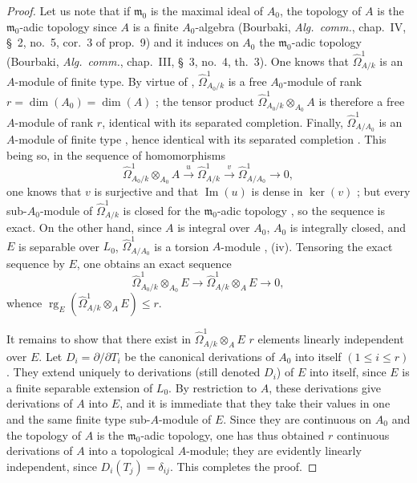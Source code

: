 \begin{proof}
Let us note that if $\mathfrak{m}_0$ is the maximal ideal of $A_0$, the topology of $A$ is the $\mathfrak{m}_0$-adic topology since $A$ is a finite $A_0$-algebra (Bourbaki, \emph{Alg.\ comm.}, chap.~IV, \S~2, no.~5, cor.~3 of prop.~9) and it induces on $A_0$ the $\mathfrak{m}_0$-adic topology (Bourbaki, \emph{Alg.\ comm.}, chap.~III, \S~3, no.~4, th.~3).
One knows  that $\widehat{\Omega}^1_{A/k}$ is an $A$-module of finite type.
By virtue of , $\widehat{\Omega}^1_{A_0/k}$ is a free $A_0$-module of rank $r=\dim(A_0)=\dim(A)$ ; the tensor product $\widehat{\Omega}^1_{A_0/k}\otimes_{A_0}A$ is therefore a free $A$-module of rank $r$, identical with its separated completion.
Finally, $\widehat{\Omega}^1_{A/A_0}$ is an $A$-module of finite type , hence identical with its separated completion .
This being so, in the sequence of homomorphisms
\begin{equation}
\tag{21.9.5.2}
  \label{0.21.9.5.2}
  \widehat{\Omega}^1_{A_0/k}\otimes_{A_0} A\xrightarrow{u}\widehat{\Omega}^1_{A/k}\xrightarrow{v}\widehat{\Omega}^1_{A/A_0}\to 0,
\end{equation}
one knows that $v$ is surjective and that $\operatorname{Im}(u)$ is dense in $\ker(v)$ ; but every sub-$A_0$-module of $\widehat{\Omega}^1_{A/k}$ is closed for the $\mathfrak{m}_0$-adic topology , so the sequence  is exact.
On the other hand, since $A$ is integral over $A_0$, $A_0$ is integrally closed, and $E$ is separable over $L_0$, $\widehat{\Omega}^1_{A/A_0}$ is a torsion $A$-module , (iv).
Tensoring the exact sequence  by $E$, one obtains an exact sequence
\[
  \widehat{\Omega}^1_{A_0/k}\otimes_{A_0}E\longrightarrow
  \widehat{\Omega}^1_{A/k}\otimes_A E\longrightarrow 0,
\]
whence $\operatorname{rg}_E(\widehat{\Omega}^1_{A/k}\otimes_AE)\leqslant r$.

It remains to show that there exist in $\widehat{\Omega}^1_{A/k}\otimes_AE$ $r$ elements linearly independent over $E$.
Let $D_i=\partial/\partial T_i$ be the canonical derivations of $A_0$ into itself $(1\leqslant i\leqslant r)$.
They extend uniquely to derivations (still denoted $D_i$) of $E$ into itself, since $E$ is a finite separable extension of $L_0$.
By restriction to $A$, these derivations give derivations of $A$ into $E$, and it is immediate that they take their values in one and the same finite type sub-$A$-module of $E$.
Since they are continuous on $A_0$ and the topology of $A$ is the $\mathfrak{m}_0$-adic topology, one has thus obtained $r$ continuous derivations of $A$ into a topological $A$-module; they are evidently linearly independent, since $D_i(T_j)=\delta_{ij}$.
This completes the proof.
\end{proof}

